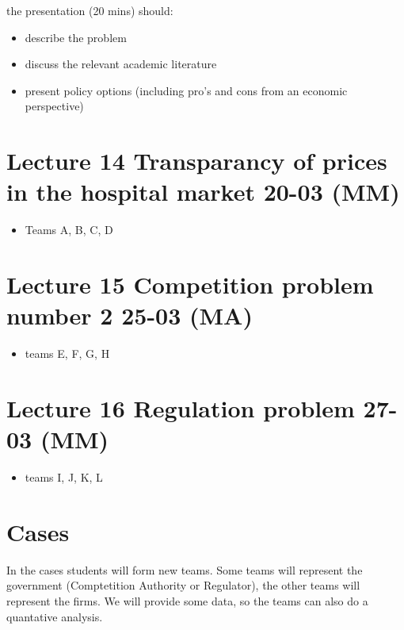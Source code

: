 \documentclass[]{book}
\providecommand{\tightlist}{%
  \setlength{\itemsep}{0pt}\setlength{\parskip}{0pt}}
\begin{document}
the presentation (20 mins) should:

\begin{itemize}
\tightlist
\item
  describe the problem
\item
  discuss the relevant academic literature
\item
  present policy options (including pro's and cons from an economic
  perspective)
\end{itemize}

\section{Lecture 14 Transparancy of prices in the hospital market 20-03
(MM)}\label{lecture-14-transparancy-of-prices-in-the-hospital-market-20-03-mm}

\begin{itemize}
\tightlist
\item
  Teams A, B, C, D
\end{itemize}

\section{Lecture 15 Competition problem number 2 25-03
(MA)}\label{lecture-15-competition-problem-number-2-25-03-ma}

\begin{itemize}
\tightlist
\item
  teams E, F, G, H
\end{itemize}

\section{Lecture 16 Regulation problem 27-03
(MM)}\label{lecture-16-regulation-problem-27-03-mm}

\begin{itemize}
\tightlist
\item
  teams I, J, K, L
\end{itemize}

\section{Cases}\label{cases}

In the cases students will form new teams. Some teams will represent the
government (Comptetition Authority or Regulator), the other teams will
represent the firms. We will provide some data, so the teams can also do
a quantative analysis.
\end{document}
